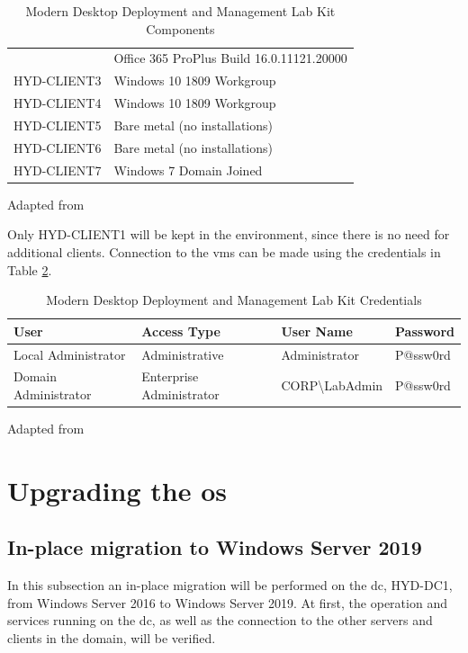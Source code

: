 \begin{table}[ht]
\begin{adjustbox}{width=1\textwidth}
\begin{tabular}{l|l}
		& Office 365 ProPlus Build 16.0.11121.20000                           									 \\
		HYD-CLIENT3  & Windows 10 1809 Workgroup                                         						  \\
		HYD-CLIENT4  & Windows 10 1809 Workgroup                                          						   \\
		HYD-CLIENT5 & Bare metal (no installations)                                      						    \\
		HYD-CLIENT6 & Bare metal (no installations)                                       							 \\
		HYD-CLIENT7  & Windows 7 Domain Joined                                            
	\end{tabular}
	\end{adjustbox}
	\caption[Lab Kit Components]{Modern Desktop Deployment and Management Lab Kit Components}
	\scriptsize	
	Adapted from \cite{MicrosoftCorporation2019}
	\label{tab:LKC}
\end{table}

	
Only HYD-CLIENT1 will be kept in the environment, since there is no need for additional clients. Connection to the \acrshort{vm}s can be made using the credentials in Table \ref{tab:LKCred}.

\begin{table}[ht]
	\centering
	\begin{adjustbox}{width=1\textwidth}
	\begin{tabular}{l|lll}
		User                 & Access Type              & User Name                    & Password \\
		\hline
		Local Administrator  & Administrative           & Administrator                & P@ssw0rd \\
		Domain Administrator & Enterprise Administrator & CORP\textbackslash{}LabAdmin & P@ssw0rd
	\end{tabular}
	\end{adjustbox}
	\caption[Lab Kit Credentials]{Modern Desktop Deployment and Management Lab Kit Credentials}
	\scriptsize	
	Adapted from \cite{MicrosoftCorporation2019}
	\label{tab:LKCred}
\end{table}

\section{Upgrading the \acrshort{os}}
\subsection{In-place migration to Windows Server 2019}
\label{subsection:Inplace}
In this subsection an in-place migration will be performed on the \acrfull{dc}, HYD-DC1, from Windows Server 2016 to Windows Server 2019. At first, the operation and services running on the \acrshort{dc}, as well as the connection to the other servers and clients in the domain, will be verified.
